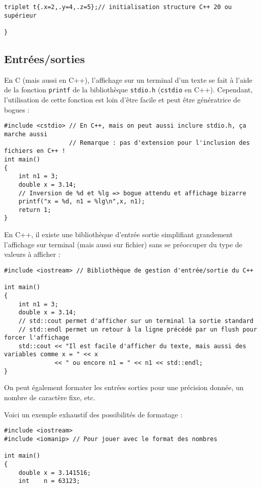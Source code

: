 \begin{itemize}
\begin{lstlisting}[caption=déclaration d'une structure au sein d'une fonction (C++ 11 ou supérieur)]
    triplet t{.x=2,.y=4,.z=5};// initialisation structure C++ 20 ou supérieur

}
\end{lstlisting}

\subsection{Entrées/sorties}

En C (mais aussi en C++), l'affichage sur un terminal d'un texte se fait à l'aide de la fonction \texttt{printf}
de la bibliothèque \texttt{stdio.h} (\texttt{cstdio} en C++). Cependant, l'utilisation de cette fonction est loin d'être facile
et peut être génératrice de bogues :

\begin{lstlisting}
#include <cstdio> // En C++, mais on peut aussi inclure stdio.h, ça marche aussi
                  // Remarque : pas d'extension pour l'inclusion des fichiers en C++ !
int main()
{
    int n1 = 3;
    double x = 3.14;
    // Inversion de %d et %lg => bogue attendu et affichage bizarre
    printf("x = %d, n1 = %lg\n",x, n1);
    return 1;
}
\end{lstlisting}

En C++, il existe une bibliothèque d'entrée sortie simplifiant grandement l'affichage sur terminal (mais aussi sur fichier) sans se préoccuper du type de valeurs à afficher :

\begin{lstlisting}
#include <iostream> // Bibliothèque de gestion d'entrée/sortie du C++

int main()
{
    int n1 = 3;
    double x = 3.14;
    // std::cout permet d'afficher sur un terminal la sortie standard
    // std::endl permet un retour à la ligne précédé par un flush pour forcer l'affichage
    std::cout << "Il est facile d'afficher du texte, mais aussi des variables comme x = " << x
              << " ou encore n1 = " << n1 << std::endl;
}
\end{lstlisting}

On peut également formater les entrées sorties pour une précision donnée, un nombre de caractère fixe, etc.

Voici un exemple exhaustif des possibilités de formatage :
\begin{lstlisting}
#include <iostream>
#include <iomanip> // Pour jouer avec le format des nombres

int main()
{
    double x = 3.141516;
    int    n = 63123;


\end{lstlisting}
\end{itemize}
